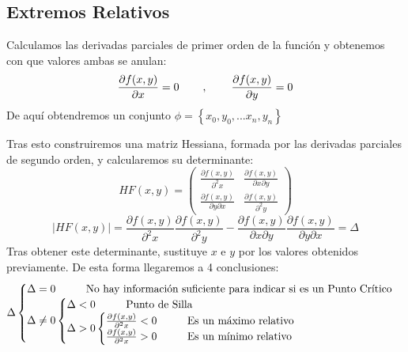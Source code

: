 \subsection{Extremos Relativos}
\noindent Calculamos las derivadas parciales de primer orden de la función y obtenemos con que valores ambas se anulan:
\[
        \frac{\partial f(x,y)}{\partial x} = 0 \hspace{0.75cm},\hspace{0.75cm} \frac{\partial f(x,y)}{\partial y} = 0
\]
\noindent De aquí obtendremos un conjunto \(\phi = \left \{ \left.  x_0, y_0, ... x_n, y_n\right \} \right.\)\par \noindent Tras esto construiremos una matriz Hessiana, formada por las derivadas parciales de segundo orden, y calcularemos su determinante:
\[\boxed{HF(x,y) = \begin{pmatrix}
                        \frac{\partial f(x,y)}{\partial^2 x}           & \frac{\partial f(x,y)}{\partial x \partial y} \\
                        \frac{\partial f(x,y)}{ \partial y \partial x} & \frac{\partial f(x,y)}{\partial^2 y}
                \end{pmatrix}}
\]
\[
        |HF(x,y)| =  \frac{\partial f(x,y)}{\partial^2 x} \frac{\partial f(x,y)}{\partial^2 y} - \frac{\partial f(x,y)}{\partial x \partial y}\frac{\partial f(x,y)}{ \partial y \partial x} = \Delta
\]
\noindent Tras obtener este determinante, sustituye \(x\) e \(y\) por los valores obtenidos previamente. De esta forma llegaremos a 4 conclusiones:
\[
        \Delta
        \begin{cases}
                \Delta = 0 \text{\hspace{1cm}No hay información suficiente para indicar si es un Punto Crítico}
                \\
                \Delta \neq 0
                \begin{cases}
                        \Delta < 0  \text{\hspace{1cm}Punto de Silla}
                        \\
                        \Delta > 0
                        \begin{cases}
                                \frac{\partial f(x,y)}{\partial^2 x} < 0  \text{\hspace{1cm}Es un máximo relativo}
                                \\
                                \frac{\partial f(x,y)}{\partial^2 x} > 0  \text{\hspace{1cm}Es un mínimo relativo}
                        \end{cases}
                \end{cases}
        \end{cases}
\]